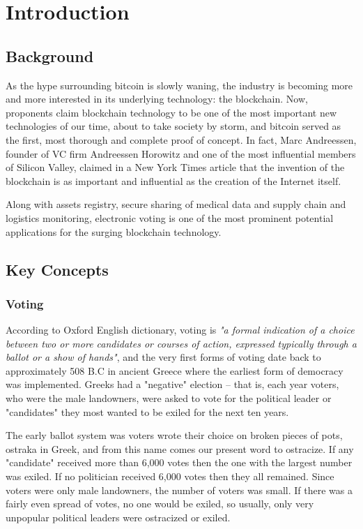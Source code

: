 \chapter{Introduction}
\section{Background}

As the hype surrounding bitcoin is slowly waning, the industry is becoming more and more interested in its underlying technology: the blockchain. Now, proponents claim blockchain technology to be one of the most important new technologies of our time, about to take society by storm, and bitcoin served as the first, most thorough and complete proof of concept. In fact, Marc Andreessen, founder of VC firm Andreessen Horowitz and one of the most influential members of Silicon Valley, claimed in a New York Times article that the invention of the blockchain is as important and influential as the creation of the Internet itself\cite{andreessenWhyBitcoinMatters1390323270}.\smallskip

Along with assets registry, secure sharing of medical data and supply chain and logistics monitoring, electronic voting is one of the most prominent potential applications for the surging blockchain technology.

\section{Key Concepts}
\subsection{Voting}

According to Oxford English dictionary, voting is \textit{"a formal indication of a choice between two or more candidates or courses of action, expressed typically through a ballot or a show of hands"}, and the very first forms of voting date back to approximately 508 B.C in ancient Greece where the earliest form of democracy was implemented\cite{HistoryElections}. Greeks had a "negative" election -- that is, each year voters, who were the male landowners, were asked to vote for the political leader or "candidates" they most wanted to be exiled for the next ten years.

The early ballot system was voters wrote their choice on broken pieces of pots, ostraka in Greek, and from this name comes our present word to ostracize. If any "candidate" received more than 6,000 votes then the one with the largest number was exiled. If no politician received 6,000 votes then they all remained. Since voters were only male landowners, the number of voters was small. If there was a fairly even spread of votes, no one would be exiled, so usually, only very unpopular political leaders were ostracized or exiled.

